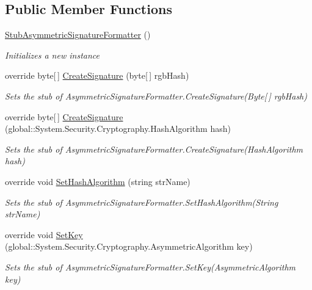 \subsection*{Public Member Functions}
\begin{DoxyCompactItemize}
\item 
\hyperlink{class_system_1_1_security_1_1_cryptography_1_1_fakes_1_1_stub_asymmetric_signature_formatter_abeb32a05723ec0402c40825b83079ec3}{Stub\-Asymmetric\-Signature\-Formatter} ()
\begin{DoxyCompactList}\small\item\em Initializes a new instance\end{DoxyCompactList}\item 
override byte\mbox{[}$\,$\mbox{]} \hyperlink{class_system_1_1_security_1_1_cryptography_1_1_fakes_1_1_stub_asymmetric_signature_formatter_a423b59a0b641ebe28c9a9e82a195e339}{Create\-Signature} (byte\mbox{[}$\,$\mbox{]} rgb\-Hash)
\begin{DoxyCompactList}\small\item\em Sets the stub of Asymmetric\-Signature\-Formatter.\-Create\-Signature(\-Byte\mbox{[}$\,$\mbox{]} rgb\-Hash)\end{DoxyCompactList}\item 
override byte\mbox{[}$\,$\mbox{]} \hyperlink{class_system_1_1_security_1_1_cryptography_1_1_fakes_1_1_stub_asymmetric_signature_formatter_a7ae3c8d9f0d5a404c1dba4826e094320}{Create\-Signature} (global\-::\-System.\-Security.\-Cryptography.\-Hash\-Algorithm hash)
\begin{DoxyCompactList}\small\item\em Sets the stub of Asymmetric\-Signature\-Formatter.\-Create\-Signature(\-Hash\-Algorithm hash)\end{DoxyCompactList}\item 
override void \hyperlink{class_system_1_1_security_1_1_cryptography_1_1_fakes_1_1_stub_asymmetric_signature_formatter_af564e1c5d0dc6b6b756d6fb9981b5fff}{Set\-Hash\-Algorithm} (string str\-Name)
\begin{DoxyCompactList}\small\item\em Sets the stub of Asymmetric\-Signature\-Formatter.\-Set\-Hash\-Algorithm(\-String str\-Name)\end{DoxyCompactList}\item 
override void \hyperlink{class_system_1_1_security_1_1_cryptography_1_1_fakes_1_1_stub_asymmetric_signature_formatter_a1707e0176634e6c948d66cfccbea8655}{Set\-Key} (global\-::\-System.\-Security.\-Cryptography.\-Asymmetric\-Algorithm key)
\begin{DoxyCompactList}\small\item\em Sets the stub of Asymmetric\-Signature\-Formatter.\-Set\-Key(\-Asymmetric\-Algorithm key)\end{DoxyCompactList}\end{DoxyCompactItemize}

